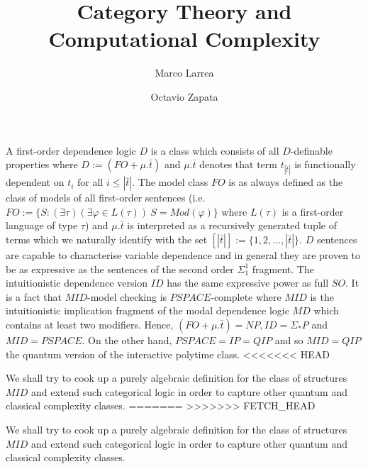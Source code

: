 

\title{Category Theory and \\ Computational Complexity}
\author{Marco Larrea \and Octavio Zapata}


\maketitle
A first-order dependence logic $D$ is a class which consists of all $D$-definable properties where $D := (FO + \mu.\bar{t})$ and $\mu.\bar{t}$ denotes that term $t_{|\bar{t}|}$ is functionally dependent on $t_{i}$ for all $i\leq |\bar{t}|$. The model class $FO$ is as always defined as the class of models of all first-order sentences (i.e. $FO:= \{S:(\exists\tau)(\exists\varphi\in L(\tau))\ S=Mod(\varphi)\}$ where $L(\tau)$ is a first-order language of type $\tau$) and $\mu.\bar{t}$ is interpreted as a recursively generated tuple of terms which we naturally identify with the set $[|\bar{t}|] := \{1,2,\dots,|\bar{t}|\}$. $D$ sentences are capable to characterise variable dependence and in general they are proven to be as expressive as the sentences of the second order $\Sigma_1^1$ fragment. The intuitionistic dependence version $ID$ has the same expressive power as full $SO$. It is a fact that $MID$-model checking is $PSPACE$-complete where $MID$ is the intuitionistic implication fragment of the modal dependence logic $MD$ which contains at least two modifiers. Hence, $(FO + \mu.\bar{t}) = NP, ID = \Sigma_{\ast}P$ and $MID = PSPACE$.  On the other hand, $PSPACE = IP = QIP$ and so $MID = QIP$ the quantum version of the interactive polytime class.
<<<<<<< HEAD

We shall try to cook up a purely algebraic definition for the class of structures $MID$ and extend such categorical logic in order to capture other quantum and classical complexity classes. 
=======
>>>>>>> FETCH_HEAD

We shall try to cook up a purely algebraic definition for the class of structures $MID$ and extend such categorical logic in order to capture other quantum and classical complexity classes. 
\nocite{*}




